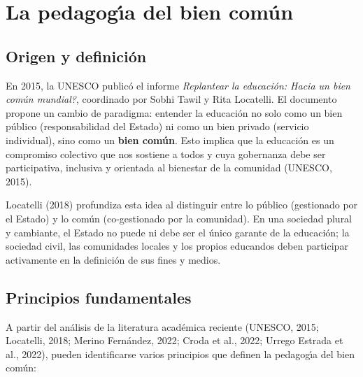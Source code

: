 \documentclass[12pt,letterpaper]{article}
\begin{document}
\section{La pedagog\'{\i}a del bien com\'un}

\subsection{Origen y definici\'on}

En 2015, la UNESCO public\'o el informe \textit{Replantear la educaci\'on: \textquestiondown Hacia un bien com\'un mundial?}, coordinado por Sobhi Tawil y Rita Locatelli. El documento propone un cambio de paradigma: entender la educaci\'on no solo como un bien p\'ublico (responsabilidad del Estado) ni como un bien privado (servicio individual), sino como un \textbf{bien com\'un}. Esto implica que la educaci\'on es un compromiso colectivo que nos sostiene a todos y cuya gobernanza debe ser participativa, inclusiva y orientada al bienestar de la comunidad (UNESCO, 2015).

Locatelli (2018) profundiza esta idea al distinguir entre lo p\'ublico (gestionado por el Estado) y lo com\'un (co-gestionado por la comunidad). En una sociedad plural y cambiante, el Estado no puede ni debe ser el \'unico garante de la educaci\'on; la sociedad civil, las comunidades locales y los propios educandos deben participar activamente en la definici\'on de sus fines y medios.

\subsection{Principios fundamentales}

A partir del an\'alisis de la literatura acad\'emica reciente (UNESCO, 2015; Locatelli, 2018; Merino Fern\'andez, 2022; Croda et al., 2022; Urrego Estrada et al., 2022), pueden identificarse varios principios que definen la pedagog\'{\i}a del bien com\'un:
\end{document}
